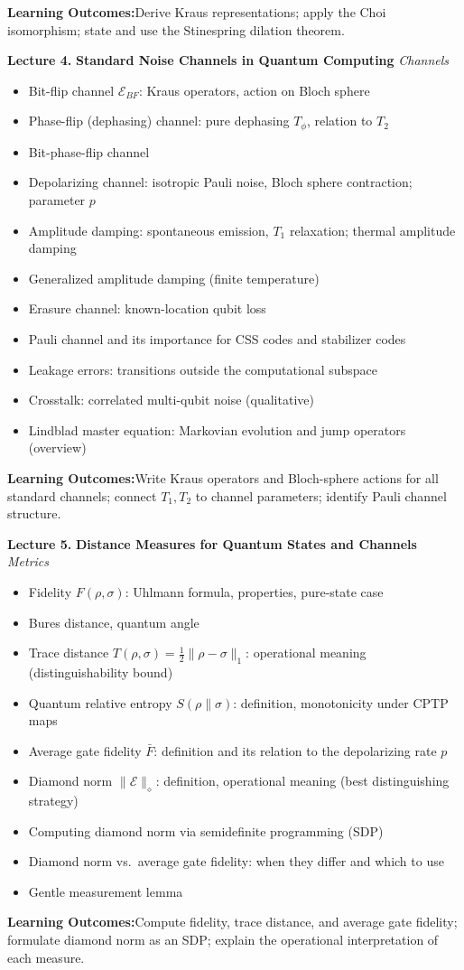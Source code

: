 \documentclass[12pt,oneside]{article}
\newcommand{\lecturetitle}[3]{%
  \vspace{10pt}
  \begin{tcolorbox}[
    enhanced,breakable,
    colback=highlight,colframe=accent,
    arc=2pt,left=10pt,right=8pt,top=7pt,bottom=7pt,boxrule=0.7pt
  ]
    \textbf{\color{accent}Lecture #1.\enspace}%
    {\color{primary}\bfseries #2}%
    \hfill{\small\color{warmgold}\textit{#3}}
  \end{tcolorbox}
  \vspace{-2pt}
}
\newcommand{\topics}[1]{%
  \begin{itemize}[leftmargin=1.5em,itemsep=1.5pt,topsep=3pt,parsep=0pt]
    #1
  \end{itemize}\vspace{2pt}
}
\newcommand{\T}[1]{\item #1}
\newcommand{\keybox}[1]{%
  \begin{tcolorbox}[
    enhanced,colback=lightgray,colframe=rulegray,
    arc=2pt,left=8pt,right=8pt,top=5pt,bottom=5pt,boxrule=0.4pt,
    fontupper=\small
  ]
    \textbf{\color{primary}Learning Outcomes:\enspace}#1
  \end{tcolorbox}\vspace{4pt}
}
\begin{document}
\keybox{Derive Kraus representations; apply the Choi isomorphism; state and use the Stinespring dilation theorem.}

\lecturetitle{4}{Standard Noise Channels in Quantum Computing}{Channels}

\topics{
  \T{Bit-flip channel $\mathcal{E}_{BF}$: Kraus operators, action on Bloch sphere}
  \T{Phase-flip (dephasing) channel: pure dephasing $T_\phi$, relation to $T_2$}
  \T{Bit-phase-flip channel}
  \T{Depolarizing channel: isotropic Pauli noise, Bloch sphere contraction; parameter $p$}
  \T{Amplitude damping: spontaneous emission, $T_1$ relaxation; thermal amplitude damping}
  \T{Generalized amplitude damping (finite temperature)}
  \T{Erasure channel: known-location qubit loss}
  \T{Pauli channel and its importance for CSS codes and stabilizer codes}
  \T{Leakage errors: transitions outside the computational subspace}
  \T{Crosstalk: correlated multi-qubit noise (qualitative)}
  \T{Lindblad master equation: Markovian evolution and jump operators (overview)}
}

\keybox{Write Kraus operators and Bloch-sphere actions for all standard channels; connect $T_1, T_2$ to channel parameters; identify Pauli channel structure.}

\lecturetitle{5}{Distance Measures for Quantum States and Channels}{Metrics}

\topics{
  \T{Fidelity $F(\rho,\sigma)$: Uhlmann formula, properties, pure-state case}
  \T{Bures distance, quantum angle}
  \T{Trace distance $T(\rho,\sigma)=\tfrac12\|\rho-\sigma\|_1$: operational meaning (distinguishability bound)}
  \T{Quantum relative entropy $S(\rho\|\sigma)$: definition, monotonicity under CPTP maps}
  \T{Average gate fidelity $\bar{F}$: definition and its relation to the depolarizing rate $p$}
  \T{Diamond norm $\|\mathcal{E}\|_\diamond$: definition, operational meaning (best distinguishing strategy)}
  \T{Computing diamond norm via semidefinite programming (SDP)}
  \T{Diamond norm vs.\ average gate fidelity: when they differ and which to use}
  \T{Gentle measurement lemma}
}

\keybox{Compute fidelity, trace distance, and average gate fidelity; formulate diamond norm as an SDP; explain the operational interpretation of each measure.}
\end{document}
